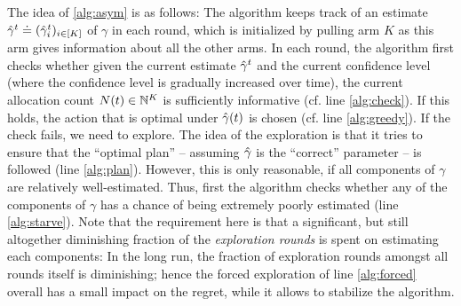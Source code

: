 The idea of \cref{alg:asym} is as follows:
The algorithm keeps track of an estimate $\hat{\gamma}^{t}\doteq(\hat{\gamma}^t_i)_{i \in [K]}$ of $\gamma$ in each round, which is initialized by pulling arm $K$ as this arm
gives information about all the other arms.
In each round, the algorithm first checks whether given the current estimate $\hat{\gamma}^t$ and the current confidence level (where the confidence level is gradually increased over time), the current allocation count $N(t)\in \mathbb{N}^K$
is sufficiently informative (cf. line \ref{alg:check}). If this holds, the action that is optimal under $\hat{\gamma}(t)$ is chosen 
(cf. line \ref{alg:greedy}). If the check fails, we need to explore.
The idea of the exploration is that it tries to ensure that the ``optimal plan'' -- assuming $\hat{\gamma}$ is the ``correct'' parameter -- is followed (line \ref{alg:plan}). However, this is only reasonable, if all components of $\gamma$ are relatively well-estimated.
Thus, first the algorithm checks whether any of the components of $\gamma$ has a chance of being
extremely poorly estimated (line \ref{alg:starve}). Note that the requirement here is that a significant, but still altogether diminishing fraction of the \emph{exploration rounds} is spent on estimating each components: In the long run, the fraction of exploration rounds amongst all rounds itself is diminishing; hence the forced exploration of line \ref{alg:forced} overall has a small impact on the regret, while it allows to stabilize the algorithm.

